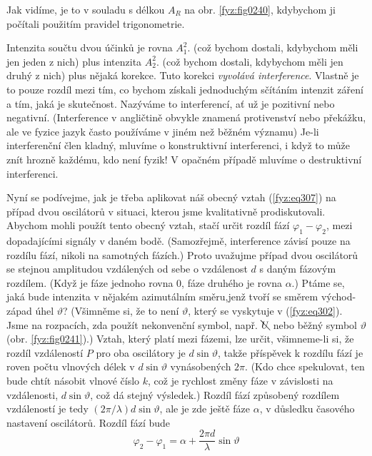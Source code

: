     Jak vidíme, je to v souladu s délkou \(A_R\) na obr. \ref{fyz:fig0240}, kdybychom ji počítali 
    použitím pravidel trigonometrie. 
    
    Intenzita součtu dvou účinků je rovna \(A_1^2\). (což bychom dostali, kdybychom měli jen jeden 
    z nich) plus intenzita \(A_2^2\). (což bychom dostali, kdybychom měli jen druhý z nich) plus 
    nějaká korekce. Tuto korekci \emph{vyvolává interference}. Vlastně je to pouze rozdíl mezi tím, 
    co bychom získali jednoduchým sčítáním intenzit záření a tím, jaká je skutečnost. Nazýváme to 
    interferencí, ať už je pozitivní nebo negativní. (Interference v angličtině obvykle znamená 
    protivenství nebo překážku, ale ve fyzice jazyk často používáme v jiném než běžném významu) 
    Je-li interferenční člen kladný, mluvíme o konstruktivní interferenci, i když to může znít 
    hrozně každému, kdo není fyzik! V opačném případě mluvíme o destruktivní interferenci. 
    
    Nyní se podívejme, jak je třeba aplikovat náš obecný vztah (\ref{fyz:eq307}) na případ dvou 
    oscilátorů v situaci, kterou jsme kvalitativně prodiskutovali. Abychom mohli použít tento 
    obecný vztah, stačí určit rozdíl fází \(\varphi_1-\varphi_2\), mezi dopadajícími signály v 
    daném bodě. (Samozřejmě, interference závisí pouze na rozdílu fází, nikoli na samotných 
    fázích.) Proto uvažujme případ dvou oscilátorů se stejnou amplitudou vzdálených od sebe o 
    vzdálenost \(d\) s daným fázovým rozdílem. (Když je fáze jednoho rovna \(0\), fáze druhého je 
    rovna \(\alpha\).) Ptáme se, jaká bude intenzita v nějakém azimutálním směru,jenž tvoří se 
    směrem východ-západ úhel \(\vartheta\)? (Všimněme si, že to není \(\vartheta\), který se 
    vyskytuje v (\ref{fyz:eq302}). Jsme na rozpacích, zda použít nekonvenční symbol, např. 
    \(\bcancel{U}\) nebo běžný symbol \(\vartheta\) (obr. \ref{fyz:fig0241}).) Vztah, který platí 
    mezi fázemi, lze určit, všimneme-li si, že rozdíl vzdáleností \(P\) pro oba oscilátory je 
    \(d\sin\vartheta\), takže příspěvek k rozdílu fází je roven počtu vlnových délek v 
    \(d\sin\vartheta\) vynásobených \(2\pi\). (Kdo chce spekulovat, ten bude chtít násobit vlnové 
    číslo \(k\), což je rychlost změny fáze v závislosti na vzdálenosti, \(d\sin\vartheta\), což dá 
    stejný výsledek.) Rozdíl fází způsobený rozdílem vzdáleností je tedy 
    \((2\pi/\lambda)d\sin\vartheta\), ale je zde ještě fáze \(\alpha\), v důsledku časového 
    nastavení oscilátorů. Rozdíl fází bude
    \begin{equation}\label{fyz:eq315}
      \varphi_2-\varphi_1 = \alpha  + \frac{2\pi d}{\lambda}\sin\vartheta
    \end{equation}
    
